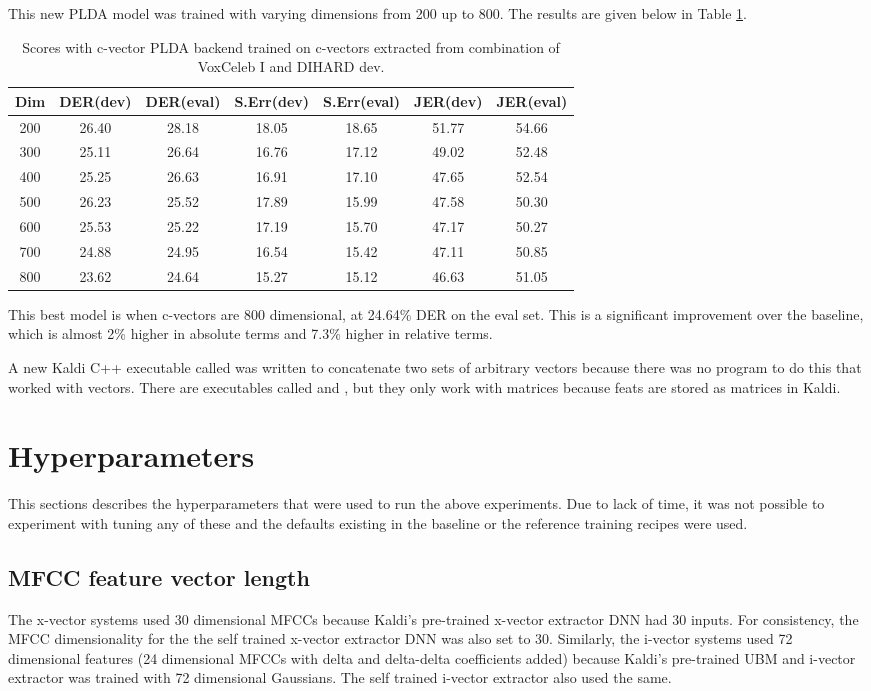 	This new PLDA model was trained with varying dimensions from 200 up to 800. The results are given below in Table \ref{table-cvector}.
	\begin{table}[h]
		\centering
		\begin{tabular}{|c|c|c|c|c|c|c|}
			\hline
			Dim & DER(dev) & DER(eval) & S.Err(dev) & S.Err(eval) & JER(dev) & JER(eval) \\
			\hline
			200 & 26.40 & 28.18 & 18.05 & 18.65 & 51.77 & 54.66 \\
			300 & 25.11 & 26.64 & 16.76 & 17.12 & 49.02 & 52.48 \\
			400 & 25.25 & 26.63 & 16.91 & 17.10 & 47.65 & 52.54 \\
			500 & 26.23 & 25.52 & 17.89 & 15.99 & 47.58 & 50.30 \\
			600 & 25.53 & 25.22 & 17.19 & 15.70 & 47.17 & 50.27 \\
			700 & 24.88 & 24.95 & 16.54 & 15.42 & 47.11 & 50.85 \\
			800 & 23.62 & 24.64 & 15.27 & 15.12 & 46.63 & 51.05 \\
			\hline
		\end{tabular}
		\caption{Scores with c-vector PLDA backend trained on c-vectors extracted from combination of VoxCeleb I and DIHARD dev.}
		\label{table-cvector}
	\end{table}

	This best model is when c-vectors are 800 dimensional, at 24.64\% DER on the eval set. This is a significant improvement over the baseline, which is almost 2\% higher in absolute terms and 7.3\% higher in relative terms.
	
	A new Kaldi C++ executable called  was written to concatenate two sets of arbitrary vectors because there was no program to do this that worked with vectors. There are executables called  and , but they only work with matrices because feats are stored as matrices in Kaldi.
	
	\section{Hyperparameters}
		This sections describes the hyperparameters that were used to run the above experiments. Due to lack of time, it was not possible to experiment with tuning any of these and the defaults existing in the baseline or the reference training recipes were used.\\
		\subsection{MFCC feature vector length}
			The x-vector systems used 30 dimensional MFCCs because Kaldi's pre-trained x-vector extractor DNN had 30 inputs. For consistency, the MFCC dimensionality for the the self trained x-vector extractor DNN was also set to 30.
			Similarly, the i-vector systems used 72 dimensional features (24 dimensional MFCCs with delta and delta-delta coefficients added) because Kaldi's pre-trained UBM and i-vector extractor was trained with 72 dimensional Gaussians. The self trained i-vector extractor also used the same.
